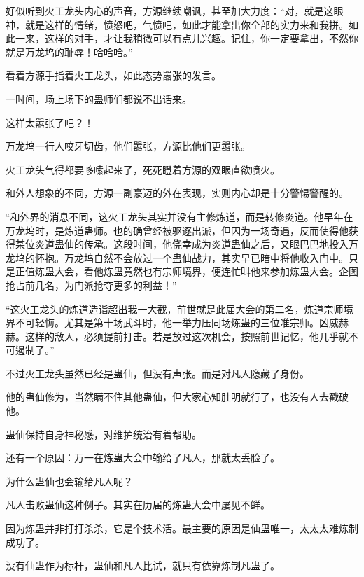 
\begin{this_body}



好似听到火工龙头内心的声音，方源继续嘲讽，甚至加大力度：“对，就是这眼神，就是这样的情绪，愤怒吧，气愤吧，如此才能拿出你全部的实力来和我拼。如此一来，这样的对手，才让我稍微可以有点儿兴趣。记住，你一定要拿出，不然你就是万龙坞的耻辱！哈哈哈。”

看着方源手指着火工龙头，如此态势嚣张的发言。

一时间，场上场下的蛊师们都说不出话来。

这样太嚣张了吧？！

万龙坞一行人咬牙切齿，他们嚣张，方源比他们更嚣张。

火工龙头气得都要哆嗦起来了，死死瞪着方源的双眼直欲喷火。

和外人想象的不同，方源一副豪迈的外在表现，实则内心却是十分警惕警醒的。

“和外界的消息不同，这火工龙头其实并没有主修炼道，而是转修炎道。他早年在万龙坞时，是炼道蛊师。也的确曾经被驱逐出派，但因为一场奇遇，反而使得他获得某位炎道蛊仙的传承。这段时间，他侥幸成为炎道蛊仙之后，又眼巴巴地投入万龙坞的怀抱。万龙坞自然不会放过一个蛊仙战力，其实早已暗中将他收入门中。只是正值炼蛊大会，看他炼蛊竟然也有宗师境界，便连忙叫他来参加炼蛊大会。企图抢占前几名，为门派抢夺更多的利益！”

“这火工龙头的炼道造诣超出我一大截，前世就是此届大会的第二名，炼道宗师境界不可轻悔。尤其是第十场武斗时，他一举力压同场炼蛊的三位准宗师。凶威赫赫。这样的敌人，必须提前打击。若是放过这次机会，按照前世记忆，他几乎就不可遏制了。”

不过火工龙头虽然已经是蛊仙，但没有声张。而是对凡人隐藏了身份。

他的蛊仙修为，当然瞒不住其他蛊仙，但大家心知肚明就行了，也没有人去戳破他。

蛊仙保持自身神秘感，对维护统治有着帮助。

还有一个原因：万一在炼蛊大会中输给了凡人，那就太丢脸了。

为什么蛊仙也会输给凡人呢？

凡人击败蛊仙这种例子。其实在历届的炼蛊大会中屡见不鲜。

因为炼蛊并非打打杀杀，它是个技术活。最主要的原因是仙蛊唯一，太太太难炼制成功了。

没有仙蛊作为标杆，蛊仙和凡人比试，就只有依靠炼制凡蛊了。


\end{this_body}
